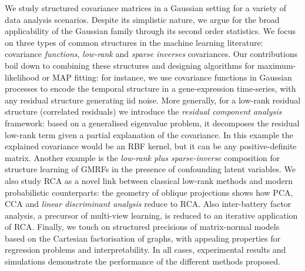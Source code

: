 


\begin{abstracts}        %


  We study structured covariance matrices in a Gaussian setting for a variety of data analysis scenarios.
  Despite its simplistic nature, we argue for the broad applicability of the Gaussian family through its second order statistics.
  We focus on three types of common structures in the machine learning literature: covariance \emph{functions}, \emph{low-rank} and \emph{sparse inverses} covariances.
  Our contributions boil down to combining these structures and designing algorithms for maximum-likelihood or MAP fitting: for instance, we use covariance functions in Gaussian processes to encode the temporal structure in a gene-expression time-series, with any residual structure generating iid noise.
  More generally, for a low-rank residual structure (correlated residuals) we introduce the \emph{residual component analysis } framework: based on a generalised eigenvalue problem, it decomposes the residual low-rank term given a partial explanation of the covariance.
  In this example the explained covariance would be an RBF kernel, but it can be any positive-definite matrix.
  Another example is the \emph{low-rank plus sparse-inverse} composition for structure learning of GMRFs in the presence of confounding latent variables.
  We also study RCA as a novel link between classical low-rank methods and modern probabilistic counterparts: the geometry of oblique projections shows how PCA, CCA and \emph{linear discriminant analysis} reduce to RCA.
  Also inter-battery factor analysis, a precursor of multi-view learning, is reduced to an iterative application of RCA.
  Finally, we touch on structured precisions of matrix-normal models based on the Cartesian factorisation of graphs, with appealing properties for regression problems and interpretability.
  In all cases, experimental results and simulations demonstrate the performance of the different methods proposed.

\end{abstracts}




